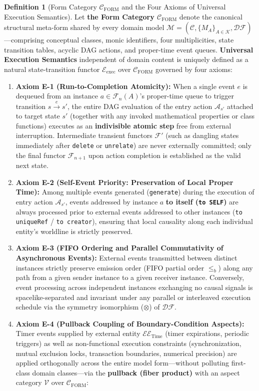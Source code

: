 \documentclass[11pt,a4paper]{article}
\theoremstyle{definition}
\newtheorem{definition}{Definition}[section]
\theoremstyle{plain}
\theoremstyle{remark}
\newcommand{\DF}{\mathcal{DF}}
\newcommand{\Cform}{\mathcal{C}_{\mathrm{FORM}}}
\begin{document}
\begin{definition}[Form Category $\Cform$ and the Four Axioms of Universal Execution Semantics]\label{def:exec-sem}
Let \textbf{the Form Category $\Cform$} denote the canonical structural meta-form shared by every domain model $\mathcal{M} = (\mathcal{C}, \{M_A\}_{A \in \mathcal{K}}, \DF)$---comprising conceptual classes, monic identifiers, four multiplicities, state transition tables, acyclic DAG actions, and proper-time event queues. \textbf{Universal Execution Semantics} independent of domain content is uniquely defined as a natural state-transition functor $\mathcal{E}_{\mathrm{exec}}$ over $\Cform$ governed by four axioms:
\begin{enumerate}
    \item \textbf{Axiom E-1 (Run-to-Completion Atomicity):} When a single event $e$ is dequeued from an instance $a \in \mathcal{F}_n(A)$'s proper-time queue to trigger transition $s \xrightarrow{e} s'$, the entire DAG evaluation of the entry action $\mathcal{A}_{s'}$ attached to target state $s'$ (together with any invoked mathematical properties or class functions) executes as an \textbf{indivisible atomic step} free from external interruption. Intermediate transient functors $\mathcal{F}'$ (such as dangling states immediately after \texttt{delete} or \texttt{unrelate}) are never externally committed; only the final functor $\mathcal{F}_{n+1}$ upon action completion is established as the valid next state.
    \item \textbf{Axiom E-2 (Self-Event Priority: Preservation of Local Proper Time):} Among multiple events generated (\texttt{generate}) during the execution of entry action $\mathcal{A}_{s'}$, events addressed by instance $a$ \textbf{to itself (\texttt{to SELF})} are always processed prior to external events addressed to other instances (\texttt{to uniqueRef} / \texttt{to creator}), ensuring that local causality along each individual entity's worldline is strictly preserved.
    \item \textbf{Axiom E-3 (FIFO Ordering and Parallel Commutativity of Asynchronous Events):} External events transmitted between distinct instances strictly preserve emission order (FIFO partial order $\le_b$) along any path from a given sender instance to a given receiver instance. Conversely, event processing across independent instances exchanging no causal signals is spacelike-separated and invariant under any parallel or interleaved execution schedule via the symmetry isomorphism ($\otimes$) of $\DF$.
    \item \textbf{Axiom E-4 (Pullback Coupling of Boundary-Condition Aspects):} Timer events supplied by external entity $\mathcal{EE}_{\mathrm{Time}}$ (timer expirations, periodic triggers) as well as non-functional execution constraints (synchronization, mutual exclusion locks, transaction boundaries, numerical precision) are applied orthogonally across the entire model form---without polluting first-class domain classes---via the \textbf{pullback (fiber product)} with an aspect category $\mathcal{V}$ over $\Cform$:

\end{enumerate}
\end{definition}
\end{document}

